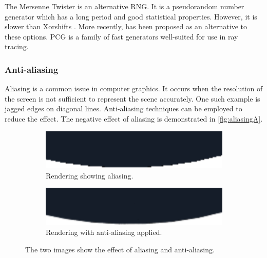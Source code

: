 The Mersenne Twister \cite{rngMersenneTwister} is an alternative \gls{RNG}. It is a pseudorandom number generator which has a long period and good statistical properties. However, it is slower than Xorshifts \cite{o2014pcg}. More recently,  has been proposed as an alternative to these options. \gls{PCG} is a family of fast generators well-suited for use in ray tracing.

\subsubsection{Anti-aliasing}
\label{sec:anti-aliasing}

Aliasing is a common issue in computer graphics. It occurs when the resolution of the screen is not sufficient to represent the scene accurately. One such example is jagged edges on diagonal lines. Anti-aliasing techniques can be employed to reduce the effect. The negative effect of aliasing is demonstrated in \autoref{fig:aliasingA}.

\begin{figure}[H]
    \centering
    \begin{subfigure}[b]{0.45\textwidth}
        \includegraphics[width=\textwidth]{resources/aliasing.png}
        \caption{Rendering showing aliasing.}
        \label{fig:aliasingA}
    \end{subfigure}
    \hfill
    \begin{subfigure}[b]{0.45\textwidth}
        \includegraphics[width=\textwidth]{resources/anti-aliasing.png}
        \caption{Rendering with anti-aliasing applied.}
        \label{fig:aliasingB}
    \end{subfigure}
    \caption{The two images show the effect of aliasing and anti-aliasing.}
    \label{fig:aliasing}
\end{figure}

